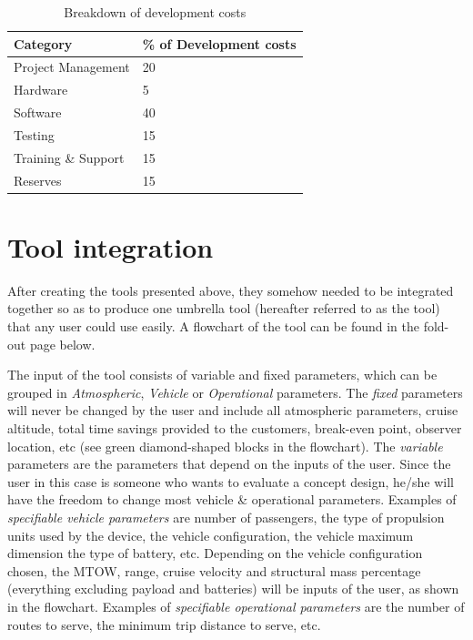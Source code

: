 \begin{table}[H]
\centering
\captionsetup{justification=centering}
\caption{Breakdown of development costs}
\label{Devcosts}
\begin{tabular}{@{}ll@{}}
Category            & \% of Development costs \\ \midrule
Project Management  & 20                      \\
Hardware            & 5                       \\
Software            & 40                      \\
Testing             & 15                      \\
Training \& Support & 15                      \\
Reserves            & 15                      \\ \bottomrule
\end{tabular}
\end{table}







\section{Tool integration} 
\label{sec:toolintegration}

After creating the tools presented above, they somehow needed to be integrated together so as to produce one umbrella tool (hereafter referred to as the tool) that any user could use easily. A flowchart of the tool can be found in the fold-out page below. 

The input of the tool consists of variable and fixed parameters, which can be grouped in \textit{Atmospheric}, \textit{Vehicle} or \textit{Operational} parameters. The \textit{fixed} parameters will never be changed by the user and include all atmospheric parameters, cruise altitude, total time savings provided to the customers, break-even point, observer location, etc (see green diamond-shaped blocks in the flowchart). The \textit{variable} parameters are the parameters that depend on the inputs of the user. Since the user in this case is someone who wants to evaluate a concept design, he/she will have the freedom to change most vehicle \& operational parameters. Examples of \textit{specifiable vehicle parameters} are number of passengers, the type of propulsion units used by the device, the vehicle configuration, the vehicle maximum dimension the type of battery, etc. Depending on the vehicle configuration chosen, the MTOW, range, cruise velocity and structural mass percentage (everything excluding payload and batteries) will be inputs of the user, as shown in the flowchart.  Examples of \textit{specifiable operational parameters} are the number of routes to serve, the minimum trip distance to serve, etc.

